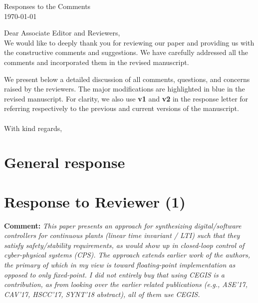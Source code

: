 \documentclass{article}
\newcommand{\vold}[1]{\colorbox{red!20}{\bfseries #1}}
\newcommand{\vnew}[1]{\colorbox{blue!30}{\bfseries #1}}
\begin{document}
\begin{center}
{\Large Responses to the Comments}\\\vspace{0.3cm}
\today
\end{center}
\vspace{1cm}
Dear Associate Editor and Reviewers,\vspace{0.3cm}
\\
We would like to deeply thank you for reviewing our paper and providing us with the constructive comments and suggestions. We have carefully addressed
all the comments and incorporated them in the revised manuscript.

We present below a detailed discussion of all comments, questions, and concerns raised by the reviewers. The major modifications are highlighted in
blue in the revised manuscript. For clarity,  we also use \vold{v1} and \vnew{v2} in the response letter for referring respectively to the previous
and current versions of the manuscript.
\\
\\
With kind regards,\vspace{0.1cm}
\\

%
\newpage

\section{General response}




\section{Response to Reviewer (1)}
\bigskip

{\bf Comment: }{\itshape This paper presents an approach for synthesizing 
digital/software controllers for continuous plants (linear time invariant / LTI) 
such that they satisfy safety/stability requirements, as would show up in closed-loop 
control of cyber-physical systems (CPS). The approach extends earlier work of the authors, 
the primary of which in my view is toward floating-point implementation as opposed to only fixed-point. 
I did not entirely buy that using CEGIS is a contribution, as from looking over the earlier related publications 
(e.g., ASE'17, CAV'17, HSCC'17, SYNT'18 abstract), all of them use CEGIS.}

\vspace{1em}
\end{document}
